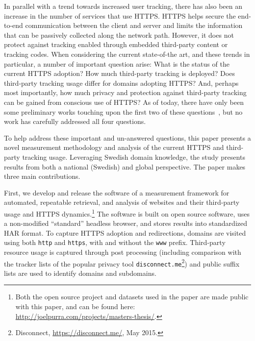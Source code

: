 \documentclass[letterpaper]{sig-alternate-10pt}
\begin{document}
In parallel with a trend towards increased user tracking, 
there has also been an increase in the number of services that use HTTPS.  
HTTPS helps secure the end-to-end communication between the client and server
and limits the information that can be passively collected along the network path. 
However, it does not protect against tracking enabled through embedded 
third-party content or tracking codes.  
When considering the current state-of-the art, and these trends in particular, 
a number of important question arise:  What is the status of the current HTTPS adoption?  
How much third-party tracking is deployed?  Does third-party tracking usage differ for 
domains adopting HTTPS?  And, perhaps most importantly, how much privacy and protection against 
third-party tracking can be gained from conscious use of HTTPS?  
As of today, there have only been some preliminary works touching upon the first 
two of these questions~\cite{BuMS11,NFL+14}, 
but no work has carefully addressed all four questions.

To help address these important and un-answered questions, this paper presents 
a novel measurement methodology and analysis of the current HTTPS and third-party tracking usage.  
Leveraging Swedish domain knowledge, the study presents results from both a national (Swedish) 
and global perspective.
The paper makes three main contributions.

First, we develop and release the software of a 
measurement framework for automated, 
repeatable retrieval, and analysis of websites and their third-party usage and 
HTTPS dynamics.\footnote{Both the open source project and datasets used in the paper 
are made public with this paper,
and can be found here:
\url{http://joelpurra.com/projects/masters-thesis/}.}  
The software is built on open source software, uses a non-modified ``standard'' headless browser, 
and stores results into standardized HAR format.  To capture HTTPS adoption and redirections, 
domains are visited using both \texttt{http} and \texttt{https}, with and without the \texttt{www} prefix. 
Third-party resource usage is captured through post processing (including comparison with the tracker 
lists of the popular privacy tool \texttt{disconnect.me}\footnote{Disconnect, \url{https://disconnect.me/}, May 2015.}) 
and public suffix lists are used to identify domains and subdomains.
\end{document}

